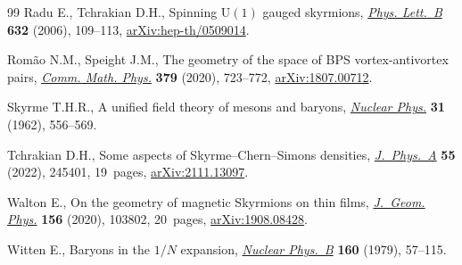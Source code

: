 \documentclass[10pt,a4paper]{amsart}
\newcommand{\1}{{\mathbb{1}}}
\numberwithin{equation}{section}
\begin{document}
\begin{thebibliography}{99}
Radu E., Tchrakian D.H., Spinning $\mathrm{U}(1)$ gauged skyrmions,
 \href{https://doi.org/10.1016/j.physletb.2005.10.020}{\textit{Phys. Lett.~B}} \textbf{632} (2006), 109--113,
 \href{https://arxiv.org/abs/hep-th/0509014}{arXiv:hep-th/0509014}.

Rom\~ao N.M., Speight J.M., The geometry of the space of {BPS}
 vortex-antivortex pairs, \href{https://doi.org/10.1007/s00220-020-03824-y}{\textit{Comm. Math. Phys.}} \textbf{379} (2020),
 723--772, \href{https://arxiv.org/abs/1807.00712}{arXiv:1807.00712}.

Skyrme T.H.R., A unified field theory of mesons and baryons, \href{https://doi.org/10.1016/0029-5582(62)90775-7}{\textit{Nuclear
 Phys.}} \textbf{31} (1962), 556--569.

Tchrakian D.H., Some aspects of {S}kyrme--{C}hern--{S}imons densities,
 \href{https://doi.org/10.1088/1751-8121/ac68b3}{\textit{J.~Phys.~A}} \textbf{55} (2022), 245401, 19~pages,
 \href{https://arxiv.org/abs/2111.13097}{arXiv:2111.13097}.

Walton E., On the geometry of magnetic {S}kyrmions on thin films,
 \href{https://doi.org/10.1016/j.geomphys.2020.103802}{\textit{J.~Geom. Phys.}} \textbf{156} (2020), 103802, 20~pages,
 \href{https://arxiv.org/abs/1908.08428}{arXiv:1908.08428}.

Witten E., Baryons in the $1/N$ expansion, \href{https://doi.org/10.1016/0550-3213(79)90232-3}{\textit{Nuclear Phys.~B}}
 \textbf{160} (1979), 57--115.

\end{thebibliography}
\end{document}
